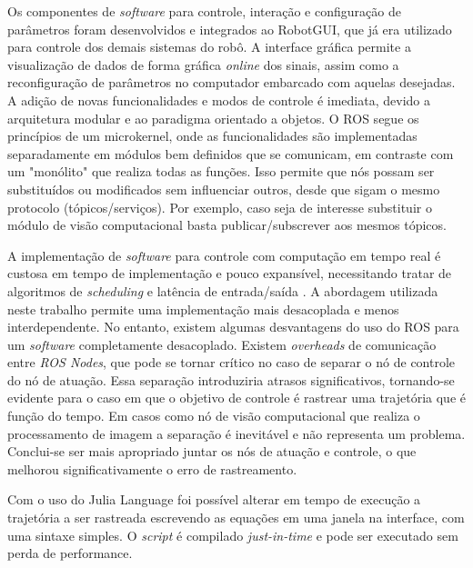 Os componentes de \textit{software} para controle, interação e configuração de parâmetros foram desenvolvidos e integrados ao RobotGUI, que já era utilizado para controle dos demais sistemas do robô. A interface gráfica permite a visualização de dados de forma gráfica \textit{online} dos sinais, assim como a reconfiguração de parâmetros no computador embarcado com aquelas desejadas. A adição de novas funcionalidades e modos de controle é imediata, devido a arquitetura modular e ao paradigma orientado a objetos. O ROS segue os princípios de um microkernel, onde as funcionalidades são implementadas separadamente em módulos bem definidos que se comunicam, em contraste com um "monólito" que realiza todas as funções. Isso permite que nós possam ser substituídos ou modificados sem influenciar outros, desde que sigam o mesmo protocolo (tópicos/serviços). Por exemplo, caso seja de interesse substituir o módulo de visão computacional basta publicar/subscrever aos mesmos tópicos.

A implementação de \textit{software} para controle com computação em tempo real é custosa em tempo de implementação e pouco expansível, necessitando tratar de algoritmos de \textit{scheduling} e latência de entrada/saída \citep{nilsson1998real}. A abordagem utilizada neste trabalho permite uma implementação mais desacoplada e menos interdependente. No entanto, existem algumas desvantagens do uso do ROS para um \textit{software} completamente desacoplado. Existem \textit{overheads} de comunicação entre \textit{ROS Nodes}, que pode se tornar crítico no caso de separar o nó de controle do nó de atuação. Essa separação introduziria atrasos significativos, tornando-se evidente para o caso em que o objetivo de controle é rastrear uma trajetória que é função do tempo. Em casos como nó de visão computacional que realiza o processamento de imagem a separação é inevitável e não representa um problema. Conclui-se ser mais apropriado juntar os nós de atuação e controle, o que melhorou significativamente o erro de rastreamento. %

Com o uso do Julia Language foi possível alterar em tempo de execução a trajetória a ser rastreada escrevendo as equações em uma janela na interface, com uma sintaxe simples. O \textit{script} é compilado \textit{just-in-time} e pode ser executado sem perda de performance.


